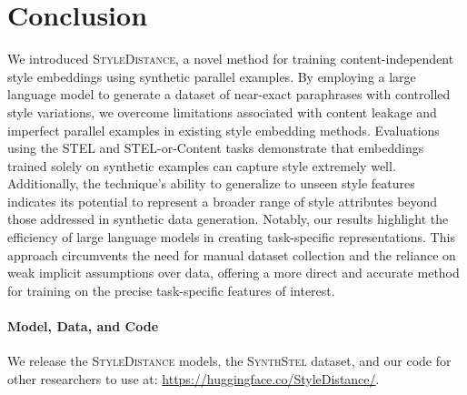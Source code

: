 \section{Conclusion}
\label{sec:conclusion}

We introduced \textsc{StyleDistance}, a novel method for training content-independent style embeddings using synthetic parallel examples. By employing a large language model to generate a dataset of near-exact paraphrases with controlled style variations, we overcome limitations associated with content leakage and imperfect parallel examples in existing style embedding methods. Evaluations using the STEL and STEL-or-Content tasks demonstrate that embeddings trained solely on synthetic examples can capture style extremely well. Additionally, the technique's ability to generalize to unseen style features indicates its potential to represent a broader range of style attributes beyond those addressed in synthetic data generation. Notably, our results highlight the efficiency of large language models in creating task-specific representations. This approach circumvents the need for manual dataset collection and the reliance on weak implicit assumptions over data, offering a more direct and accurate method for training on the precise task-specific features of interest.

\paragraph{Model, Data, and Code} We release the \textsc{StyleDistance} models, the  \textsc{SynthStel} dataset, and our code for other researchers to use at: {\small\url{https://huggingface.co/StyleDistance/}}.